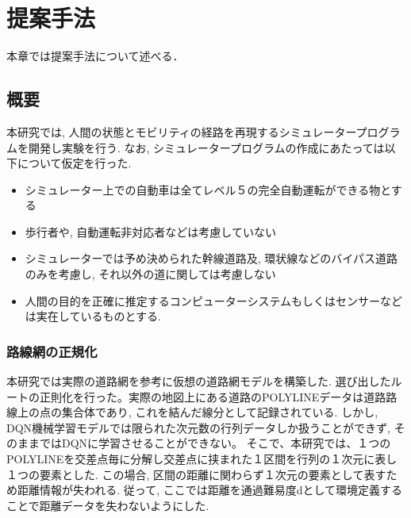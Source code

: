 \chapter{提案手法}
\label{proposed}

本章では提案手法について述べる．

\section{概要}

本研究では, 人間の状態とモビリティの経路を再現するシミュレータープログラムを開発し実験を行う.
なお, シミュレータープログラムの作成にあたっては以下について仮定を行った.

\begin{itemize}
    \item シミュレーター上での自動車は全てレベル５の完全自動運転ができる物とする
    \item 歩行者や, 自動運転非対応者などは考慮していない
    \item シミュレーターでは予め決められた幹線道路及, 環状線などのバイパス道路のみを考慮し, それ以外の道に関しては考慮しない
    \item 人間の目的を正確に推定するコンピューターシステムもしくはセンサーなどは実在しているものとする. 
\end{itemize}

\subsection{路線網の正規化}

本研究では実際の道路網を参考に仮想の道路網モデルを構築した.
選び出したルートの正則化を行った。実際の地図上にある道路のPOLYLINEデータは道路路線上の点の集合体であり, これを結んだ線分として記録されている. しかし, DQN機械学習モデルでは限られた次元数の行列データしか扱うことができず, そのままではDQNに学習させることができない。
そこで、本研究では、１つのPOLYLINEを交差点毎に分解し交差点に挟まれた１区間を行列の１次元に表し１つの要素とした.
この場合, 区間の距離に関わらず１次元の要素として表すため距離情報が失われる. 従って, ここでは距離を通過難易度dとして環境定義することで距離データを失わないようにした.



